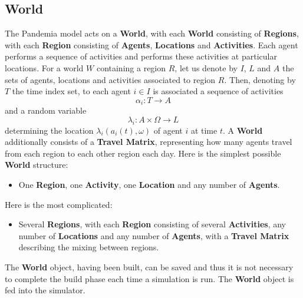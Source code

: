 \documentclass[10pt,letterpaper]{article}
\begin{document}
\subsection*{World}
The Pandemia model acts on a \textbf{World}, with each \textbf{World} consisting of \textbf{Regions}, with each \textbf{Region} consisting of \textbf{Agents}, \textbf{Locations} and \textbf{Activities}. Each agent performs a sequence of activities and performs these activities at particular locations. For a world $W$ containing a region $R$, let us denote by $I$, $L$ and $A$ the sets of agents, locations and activities associated to region $R$. Then, denoting by $T$ the time index set, to each agent $i \in I$ is associated a sequence of activities $$\alpha_i : T \rightarrow A$$ and a random variable $$\lambda_i : A \times \Omega \rightarrow L$$ determining the location $\lambda_i(a_i(t),\omega)$ of agent $i$ at time $t$. A \textbf{World} additionally consists of a \textbf{Travel Matrix}, representing how many agents travel from each region to each other region each day. Here is the simplest possible \textbf{World} structure:
\begin{itemize}
\item One \textbf{Region}, one \textbf{Activity}, one \textbf{Location} and any number of \textbf{Agents}.
\end{itemize}
Here is the most complicated:
\begin{itemize}
\item Several \textbf{Regions}, with each \textbf{Region} consisting of several \textbf{Activities}, any number of \textbf{Locations} and any number of \textbf{Agents}, with a \textbf{Travel Matrix} describing the mixing between regions.
\end{itemize}
The \textbf{World} object, having been built, can be saved and thus it is not necessary to complete the build phase each time a simulation is run. The \textbf{World} object is fed into the simulator.
\end{document}
